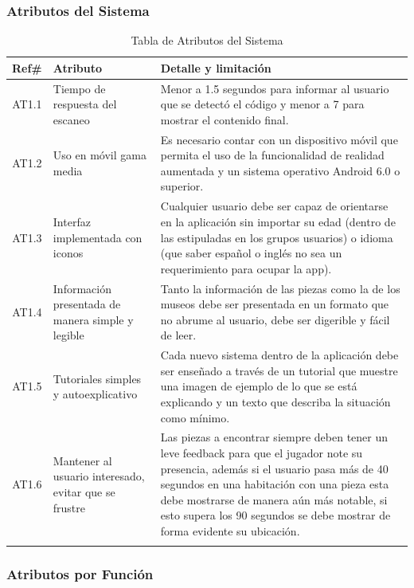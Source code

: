 \subsubsection{Atributos del Sistema}

\begin{longtable}{|c|p{3.5cm}|p{10cm}|}
\hline 
Ref\# & Atributo & Detalle y limitación \\ 
\hline 
AT1.1 & Tiempo de respuesta del escaneo & Menor a 1.5 segundos para informar al usuario que se detectó el código y menor a 7 para mostrar el contenido final.  \\ 
\hline 
AT1.2 & Uso en móvil gama media & Es necesario contar con un dispositivo móvil que permita el uso de la funcionalidad de realidad aumentada y un sistema operativo Android 6.0 o superior. \\ 
\hline
AT1.3 & Interfaz implementada con iconos & Cualquier usuario debe ser capaz de orientarse en la aplicación sin importar su edad (dentro de las estipuladas en los grupos usuarios) o idioma (que saber español o inglés no sea un requerimiento para ocupar la app).  \\ 
\hline
AT1.4 & Información presentada de manera simple y legible & Tanto la información de las piezas como la de los museos debe ser presentada en un formato que no abrume al usuario, debe ser digerible y fácil de leer.  \\ 
\hline
AT1.5 & Tutoriales simples y autoexplicativo & Cada nuevo sistema dentro de la aplicación debe ser enseñado a través de un tutorial que muestre una imagen de ejemplo de lo que se está explicando y un texto que describa la situación como mínimo.	\\ 
\hline
AT1.6 & Mantener al usuario interesado, evitar que se frustre & Las piezas a encontrar  siempre deben tener un leve feedback para que el jugador note su presencia, además si el usuario pasa más de 40 segundos en una habitación con una pieza esta debe mostrarse de manera aún más notable, si esto supera los 90 segundos se debe mostrar de forma evidente su ubicación.  \\ 
\caption{Tabla de Atributos del Sistema}
\label{tab19}\\
\end{longtable}

\subsubsection{Atributos por Función}

